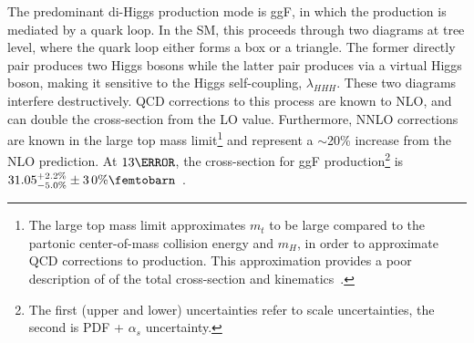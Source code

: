 The predominant di-Higgs production mode is \gls{ggF}, in which the production is mediated by a quark loop. In the \gls{SM}, this proceeds through two diagrams at tree level, where the quark loop either forms a box or a triangle. The former directly pair produces two Higgs bosons while the latter pair produces via a virtual Higgs boson, making it sensitive to the Higgs self-coupling, $\lambda_{HHH}$. These two diagrams interfere destructively. QCD corrections to this process are known to \gls{NLO}, and can double the cross-section from the \gls{LO} value. Furthermore, \gls{NNLO} corrections are known in the large top mass limit\footnote{The large top mass limit approximates $m_t$ to be large compared to the partonic center-of-mass collision energy and $m_H$, in order to approximate \gls{QCD} corrections to \HH production. This approximation provides a poor description of of the total cross-section and kinematics~\cite{large-mt}.} and represent a $\sim$20\% increase from the \gls{NLO} prediction. At $\unit{13}{\TeV}$, the cross-section for \gls{ggF} production\footnote{The first (upper and lower) uncertainties refer to scale uncertainties, the second is PDF + $\alpha_s$ uncertainty.} is $31.05^{+2.2\%}_{-5.0\%} \pm \unit{3.0\%}{\femtobarn}$~\cite{hh-crosssections}.


